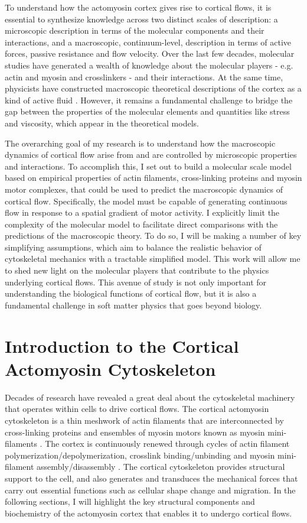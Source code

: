 To understand how the actomyosin cortex gives rise to cortical flows, it is essential to synthesize knowledge across two distinct scales of description: a microscopic description in terms of the molecular components and their interactions, and a macroscopic, continuum-level, description in terms of active forces, passive resistance and flow velocity. Over the last few decades, molecular studies have generated a wealth of knowledge about the molecular players - e.g. actin and myosin and crosslinkers - and their interactions. At the same time, physicists have constructed macroscopic theoretical descriptions of the cortex as a kind of active fluid \cite{cellmech_flows}. However, it remains a fundamental challenge to bridge the gap between the properties of the molecular elements and quantities like stress and viscosity, which appear in the theoretical models.  

The overarching goal of my research is to understand how the  macroscopic dynamics of cortical flow arise from and are controlled by microscopic properties and interactions. To accomplish this, I set out to build a molecular scale model based on empirical properties of actin filaments, cross-linking proteins and myosin motor complexes, that could be used to predict the macroscopic dynamics of cortical flow. Specifically, the model must  be capable of generating continuous flow in response to a spatial gradient of motor activity. I explicitly limit the complexity of the molecular model to facilitate direct comparisons with the predictions of the macroscopic theory. To do so, I will be making a number of key simplifying assumptions, which aim to balance the realistic behavior of cytoskeletal mechanics with a tractable simplified model. This work will allow me to shed new light on the molecular players that contribute to the physics underlying cortical flows. This avenue of study is not only important for understanding the biological functions of cortical flow, but it is also a fundamental challenge in soft matter physics that goes beyond biology.


\section{Introduction to the Cortical Actomyosin Cytoskeleton}
\label{sec:basic}
Decades of research have revealed a great deal about the cytoskeletal machinery that operates within cells to  drive cortical flows. The cortical actomyosin cytoskeleton is a thin meshwork of actin filaments that are interconnected by cross-linking proteins and ensembles of myosin motors known as myosin mini-filaments \cite{Alberts}.  The cortex  is continuously renewed through cycles of actin filament polymerization/depolymerization, crosslink binding/unbinding and myosin mini-filament assembly/disassembly \cite{phys_bio_cell}. The cortical cytoskeleton  provides structural support to the cell, and also generates and transduces the mechanical forces that carry out essential functions such as cellular shape change and migration.  In the following sections, I will highlight the key structural components and biochemistry of the actomyosin cortex that enables it to undergo cortical flows.

